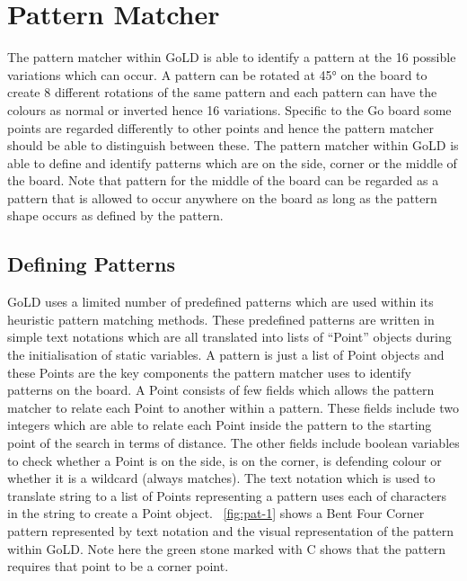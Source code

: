 \documentclass{l4proj}
\begin{document}
\section{Pattern Matcher}
The pattern matcher within GoLD is able to identify a pattern at the 16 possible variations which can occur. A pattern can be rotated at 45° on the board to create 8 different rotations of the same pattern and each pattern can have the colours as normal or inverted hence 16 variations. Specific to the Go board some points are regarded differently to other points and hence the pattern matcher should be able to distinguish between these. The pattern matcher within GoLD is able to define and identify patterns which are on the side, corner or the middle of the board. Note that pattern for the middle of the board can be regarded as a pattern that is allowed to occur anywhere on the board as long as the pattern shape occurs as defined by the pattern.

\subsection{Defining Patterns}
GoLD uses a limited number of predefined patterns which are used within its heuristic pattern matching methods. These predefined patterns are written in simple text notations which are all translated into lists of “Point” objects during the initialisation of static variables. A pattern is just a list of Point objects and these Points are the key components the pattern matcher uses to identify patterns on the board. A Point consists of few fields which allows the pattern matcher to relate each Point to another within a pattern. These fields include two integers which are able to relate each Point inside the pattern to the starting point of the search in terms of distance. The other fields include boolean variables to check whether a Point is on the side, is on the corner, is defending colour or whether it is a wildcard (always matches). The text notation which is used to translate string to a list of Points representing a pattern uses each of characters in the string to create a Point object. ~\autoref{fig:pat-1} shows a Bent Four Corner pattern represented by text notation and the visual representation of the pattern within GoLD. Note here the green stone marked with C shows that the pattern requires that point to be a corner point.
\end{document}
